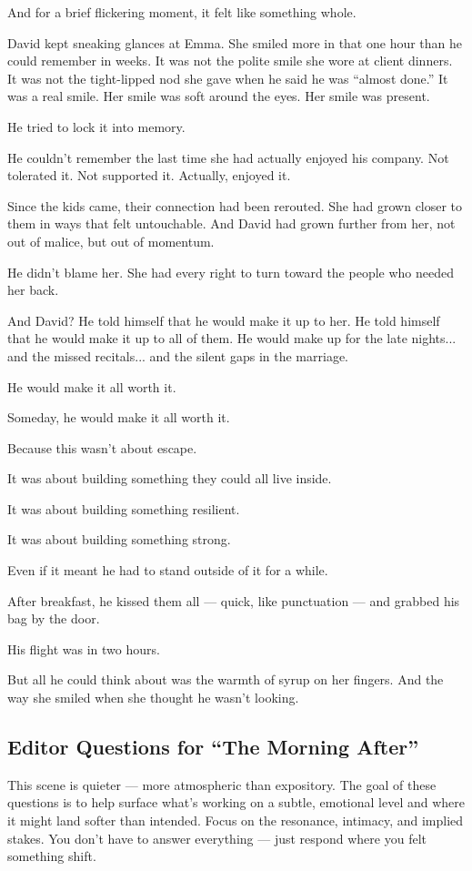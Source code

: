 And for a brief flickering moment, it felt like something whole.

David kept sneaking glances at Emma. 
She smiled more in that one hour than he could remember in weeks. 
It was not the polite smile she wore at client dinners.
It was not the tight-lipped nod she gave when he said he was ``almost done.''
It was a real smile. Her smile was soft around the eyes. Her smile was present.

He tried to lock it into memory.

He couldn’t remember the last time she had actually enjoyed his company. Not tolerated it. Not supported it. 
Actually, enjoyed it.

Since the kids came, their connection had been rerouted. 
She had grown closer to them in ways that felt untouchable. 
And David had grown further from her, not out of malice, but out of momentum.

He didn’t blame her. 
She had every right to turn toward the people who needed her back.

And David? 
He told himself that he would make it up to her. 
He told himself that he would make it up to all of them.
He would make up for the late nights... and the missed recitals... and the silent gaps in the marriage.

He would make it all worth it.

Someday, he would make it all worth it.

Because this wasn’t about escape. 

It was about building something they could all live inside.

It was about building something resilient. 

It was about building something strong.

Even if it meant he had to stand outside of it for a while.

After breakfast, he kissed them all --- quick, like punctuation --- and grabbed his bag by the door.

His flight was in two hours.

But all he could think about was the warmth of syrup on her fingers.
And the way she smiled when she thought he wasn’t looking.


\subsection*{Editor Questions for ``The Morning After''}

This scene is quieter — more atmospheric than expository. The goal of these questions is to help surface what’s working on a subtle, emotional level and where it might land softer than intended. Focus on the resonance, intimacy, and implied stakes. You don’t have to answer everything — just respond where you felt something shift.

